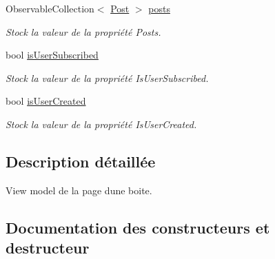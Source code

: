 \begin{DoxyCompactItemize}
Observable\+Collection$<$ \hyperlink{class_boxes_1_1_models_1_1_post}{Post} $>$ \hyperlink{class_boxes_1_1_view_models_1_1_box_view_model_ab45cdb2108ddd25aa04fe01fe48b4758}{posts}
\begin{DoxyCompactList}\small\item\em Stock la valeur de la propriété {\ttfamily Posts}. \end{DoxyCompactList}\item 
bool \hyperlink{class_boxes_1_1_view_models_1_1_box_view_model_a0700ecc606f79ce13ba0e1bb2678280a}{is\+User\+Subscribed}
\begin{DoxyCompactList}\small\item\em Stock la valeur de la propriété {\ttfamily Is\+User\+Subscribed}. \end{DoxyCompactList}\item 
bool \hyperlink{class_boxes_1_1_view_models_1_1_box_view_model_ab2e5bb78804d47d3faf1c43996737ad5}{is\+User\+Created}
\begin{DoxyCompactList}\small\item\em Stock la valeur de la propriété {\ttfamily Is\+User\+Created}. \end{DoxyCompactList}\end{DoxyCompactItemize}


\subsection{Description détaillée}
View model de la page d\textquotesingle{}une boite. 



\subsection{Documentation des constructeurs et destructeur}
